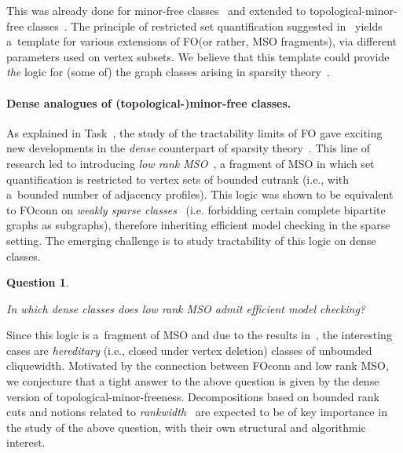 \documentclass[a4paper,11pt]{article}
\newcommand{\fo}{\textsf{FO}\xspace}
\newcommand{\foconn}{\textsf{FO\text{+}conn}\xspace}
\newcommand{\mso}{\textsf{MSO}\xspace}
\newtheorem{quest}{Question}
\newenvironment{question}
  {\begin{quest}\begin{mdframed}[style=questionstyle]}
  {\end{mdframed}\end{quest}}
\begin{document}
This was already done for minor-free classes~\cite{SauST25para} and extended to topological-minor-free classes~\cite{SauSSSTV26}.
The principle of restricted set quantification suggested in~\cite{SauST25para} yields a~template for various extensions of \fo (or rather, \mso fragments), via different parameters used on vertex subsets.
We believe that this template could provide \emph{the} logic for (some of) the graph classes arising in sparsity theory~\cite{NesetrilM12spar}.

\paragraph{Dense analogues of (topological-)minor-free classes.}
As explained in Task~, the study of the tractability limits of \fo gave exciting new developments in the \emph{dense} counterpart of sparsity theory~\cite{NesetrilM12spar}.
This line of research led to introducing
\emph{low rank \mso}~\cite{BojanczykPPSS25lowrank}, a fragment of \mso in which set quantification is restricted to vertex sets of bounded cutrank (i.e., with a~bounded number of adjacency profiles).
This logic was shown to be equivalent to \foconn on \emph{weakly sparse classes}~\cite{BojanczykPPSS25lowrank} (i.e. forbidding  certain complete bipartite graphs as subgraphs), therefore inheriting efficient model checking in the sparse setting.
The emerging challenge is to study tractability of this logic on dense classes.

\begin{question}\label{q:lrmso}
    In which dense classes does low rank \mso admit efficient model checking?
\end{question}
Since this logic is a~fragment of \mso and due to the results in~\cite{CourcelleMR00}, the interesting cases are \emph{hereditary} (i.e., closed under vertex deletion) classes of unbounded cliquewidth.
Motivated by the connection between \foconn and low rank \mso, we conjecture that a tight answer to the above question is given by the dense version of topological-minor-freeness. Decompositions based on bounded rank cuts and notions related to \emph{rankwidth}~\cite{Oum17rank} are expected to be of key importance in the study of the above question, with their own structural and algorithmic interest. 
\end{document}
